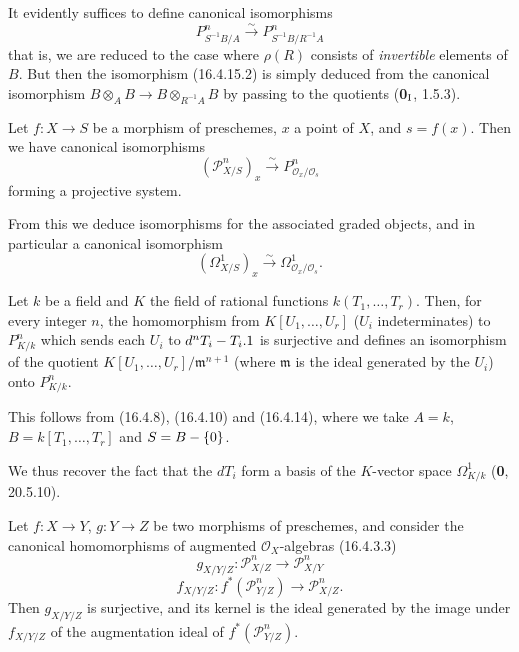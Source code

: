 It evidently suffices to define canonical isomorphisms
\[
  P_{S^{-1}B/A}^n\xrightarrow{\sim}P_{S^{-1}B/R^{-1}A}^n
  \tag{16.4.15.2}
  \label{IV.16.4.15.2}
\]
that is, we are reduced to the case where $\rho(R)$ consists of
\emph{invertible} elements of $B$. But then the isomorphism (16.4.15.2) is simply
deduced from the canonical isomorphism
$B\otimes_A B\to B\otimes_{R^{-1}A}B$ by passing to the quotients
(\textbf{0}$_{\rm I}$, 1.5.3).

\begin{corollary}[16.4.16]
\label{IV.16.4.16}
Let $f:X\to S$ be a morphism of preschemes, $x$ a point of $X$, and
$s=f(x)$. Then we have canonical isomorphisms
\[
  (\mathscr{P}_{X/S}^n)_x\xrightarrow{\sim}
  P_{\mathcal{O}_x/\mathcal{O}_s}^n
  \tag{16.4.16.1}
  \label{IV.16.4.16.1}
\]
forming a projective system.
\end{corollary}

From this we deduce isomorphisms for the associated graded objects, and in
particular a canonical isomorphism
\[
  (\varOmega_{X/S}^1)_x\xrightarrow{\sim}
  \Omega_{\mathcal{O}_x/\mathcal{O}_s}^1.
  \tag{16.4.16.2}
  \label{IV.16.4.16.2}
\]

\begin{corollary}[16.4.17]
\label{IV.16.4.17}
Let $k$ be a field and $K$ the field of rational functions
$k(T_1,\ldots,T_r)$. Then, for every integer $n$, the homomorphism from
$K[U_1,\ldots,U_r]$ ($U_i$ indeterminates) to $P_{K/k}^n$ which sends
each $U_i$ to $d^nT_i- T_i.1$ is surjective and defines an isomorphism
of the quotient $K[U_1,\ldots,U_r]/\mathfrak{m}^{n+1}$ (where $\mathfrak{m}$ is
the ideal generated by the $U_i$) onto $P_{K/k}^n$.
\end{corollary}

This follows from (16.4.8), (16.4.10) and (16.4.14), where we take $A=k$,
$B=k[T_1,\ldots,T_r]$ and $S=B-\{0\}$.

We thus recover the fact that the $dT_i$ form a basis of the $K$-vector
space $\Omega_{K/k}^1$ (\textbf{0}, 20.5.10).

\begin{proposition}[16.4.18]
\label{IV.16.4.18}
Let $f:X\to Y$, $g:Y\to Z$ be two morphisms of preschemes, and consider
the canonical homomorphisms of augmented $\mathcal{O}_X$-algebras
\textup{(16.4.3.3)}
\[
  g_{X/Y/Z}:\mathscr{P}_{X/Z}^n\longrightarrow\mathscr{P}_{X/Y}^n
  \tag{16.4.18.1}
  \label{IV.16.4.18.1}
\]
\[
  f_{X/Y/Z}:f^*(\mathscr{P}_{Y/Z}^n)
  \longrightarrow\mathscr{P}_{X/Z}^n.
  \tag{16.4.18.2}
  \label{IV.16.4.18.2}
\]
Then $g_{X/Y/Z}$ is surjective, and its kernel is the ideal generated by the
image under $f_{X/Y/Z}$ of the augmentation ideal of
$f^*(\mathscr{P}_{Y/Z}^n)$.
\end{proposition}

